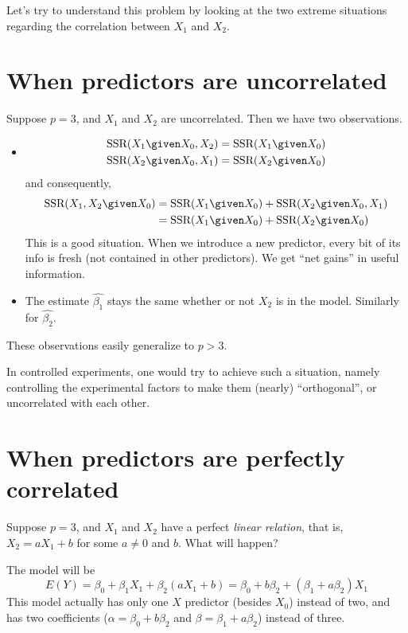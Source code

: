 \documentclass[12pt]{article}
\newcommand{\SSR}{\text{SSR}}
\begin{document}
Let's try to understand this problem by looking at the two extreme
situations regarding the correlation between $X_1$ and $X_2$.

\section{When predictors are uncorrelated}

Suppose $p = 3$, and $X_1$ and $X_2$ are uncorrelated.
Then we have two observations.
\begin{itemize}
\item
\begin{align*}
\SSR(X_1 \given X_0, X_2) &= \SSR(X_1 \given X_0) \\
\SSR(X_2 \given X_0, X_1) &= \SSR(X_2 \given X_0)
\end{align*}
and consequently,
\[\begin{split}
\SSR(X_1, X_2 \given X_0)
&= \SSR(X_1 \given X_0) + \SSR(X_2 \given X_0, X_1)
\\
&= \SSR(X_1 \given X_0) + \SSR(X_2 \given X_0)
\end{split}
\]
This is a good situation.
When we introduce a new predictor, every bit of its info is fresh (not
contained in other predictors).
We get ``net gains'' in useful information.

\item
The estimate $\hat{\beta_1}$ stays the same
whether or not $X_2$ is in the model.
Similarly for $\hat{\beta_2}$.
\end{itemize}

These observations easily generalize to $p > 3$.

\alert[Application]%
In controlled experiments,
one would try to achieve such a situation,
namely controlling the experimental factors
to make them (nearly) ``orthogonal'',
or uncorrelated with each other.

\section{When predictors are perfectly correlated}

Suppose $p=3$,
and $X_1$ and $X_2$ have a perfect \emph{linear relation},
that is,
$X_2 = aX_1 + b$ for some $a \ne 0$ and $b$.
What will happen?

The model will be
\[
E(Y)
= \beta_0 + \beta_1 X_1 + \beta_2 (aX_1 + b)
= \beta_0 + b\beta_2 + (\beta_1 + a\beta_2)X_1
\]
This model actually has only one $X$ predictor (besides $X_0$)
instead of two,
and has two coefficients
($\alpha = \beta_0 + b\beta_2$ and
$\beta = \beta_1 + a\beta_2$) instead of three.
\end{document}
